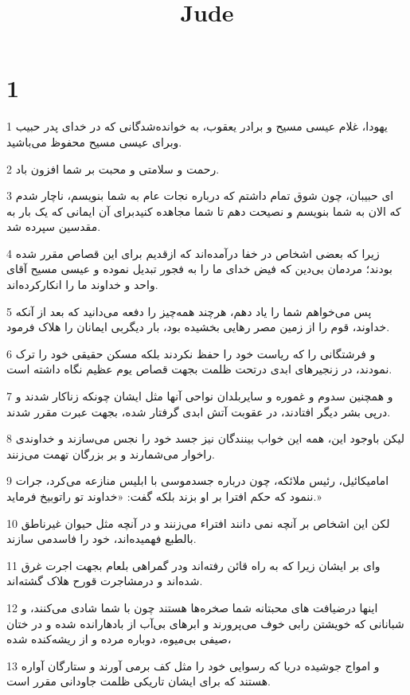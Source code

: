 

\title{Jude}


\chapter{1}

\par 1 یهودا، غلام عیسی مسیح و برادر یعقوب، به خوانده‌شدگانی که در خدای پدر حبیب وبرای عیسی مسیح محفوظ می‌باشید.
\par 2 رحمت و سلامتی و محبت بر شما افزون باد.
\par 3 ‌ای حبیبان، چون شوق تمام داشتم که درباره نجات عام به شما بنویسم، ناچار شدم که الان به شما بنویسم و نصیحت دهم تا شما مجاهده کنیدبرای آن ایمانی که یک بار به مقدسین سپرده شد.
\par 4 زیرا که بعضی اشخاص در خفا درآمده‌اند که ازقدیم برای این قصاص مقرر شده بودند؛ مردمان بی‌دین که فیض خدای ما را به فجور تبدیل نموده و عیسی مسیح آقای واحد و خداوند ما را انکارکرده‌اند.
\par 5 پس می‌خواهم شما را یاد دهم، هرچند همه‌چیز را دفعه می‌دانید که بعد از آنکه خداوند، قوم را از زمین مصر رهایی بخشیده بود، بار دیگربی ایمانان را هلاک فرمود.
\par 6 و فرشتگانی را که ریاست خود را حفظ نکردند بلکه مسکن حقیقی خود را ترک نمودند، در زنجیرهای ابدی درتحت ظلمت بجهت قصاص یوم عظیم نگاه داشته است.
\par 7 و همچنین سدوم و غموره و سایربلدان نواحی آنها مثل ایشان چونکه زناکار شدند و در‌پی بشر دیگر افتادند، در عقوبت آتش ابدی گرفتار شده، بجهت عبرت مقرر شدند.
\par 8 لیکن باوجود این، همه این خواب بینندگان نیز جسد خود را نجس می‌سازند و خداوندی راخوار می‌شمارند و بر بزرگان تهمت می‌زنند.
\par 9 امامیکائیل، رئیس ملائکه، چون درباره جسدموسی با ابلیس منازعه می‌کرد، جرات ننمود که حکم افترا بر او بزند بلکه گفت: «خداوند تو راتوبیخ فرماید.»
\par 10 لکن این اشخاص بر آنچه نمی دانند افتراء می‌زنند و در آنچه مثل حیوان غیرناطق بالطبع فهمیده‌اند، خود را فاسدمی سازند.
\par 11 وای بر ایشان زیرا که به راه قائن رفته‌اند ودر گمراهی بلعام بجهت اجرت غرق شده‌اند و درمشاجرت قورح هلاک گشته‌اند.
\par 12 اینها درضیافت های محبتانه شما صخره‌ها هستند چون با شما شادی می‌کنند، و شبانانی که خویشتن رابی خوف می‌پرورند و ابرهای بی‌آب از بادهارانده شده و در ختان صیفی بی‌میوه، دوباره مرده و از ریشه‌کنده شده،
\par 13 و امواج جوشیده دریا که رسوایی خود را مثل کف برمی آورند و ستارگان آواره هستند که برای ایشان تاریکی ظلمت جاودانی مقرر است.

